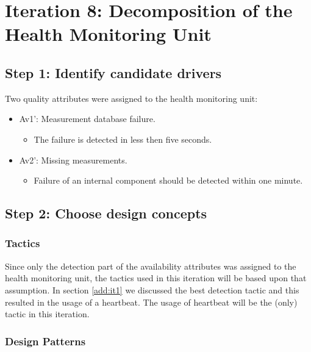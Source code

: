 \section{Iteration 8: Decomposition of the Health Monitoring Unit}
\label{add:it8}

\subsection{Step 1: Identify candidate drivers}
\label{add:it8/drivers}

\npar Two quality attributes were assigned to the health monitoring unit:

\begin{itemize}
  	\item Av1': Measurement database failure.
  	\begin{itemize}
  	  \item The failure is detected in less then five seconds.
  	\end{itemize}
  	\item Av2': Missing measurements.
  	\begin{itemize}
  	  \item Failure of an internal component should be detected within one
  	  minute.
  	\end{itemize}
\end{itemize}

\subsection{Step 2: Choose design concepts}
\label{add:it8/concepts}

\subsubsection{Tactics}
\label{add:it8/tactics}

\npar Since only the detection part of the availability attributes was assigned
to the health monitoring unit, the tactics used in this iteration will be based
upon that assumption. In section \ref{add:it1} we discussed the best detection
tactic and this resulted in the usage of a heartbeat. The usage of heartbeat
will be the (only) tactic in this iteration.

\subsubsection{Design Patterns}
\label{add:it8/patterns}

